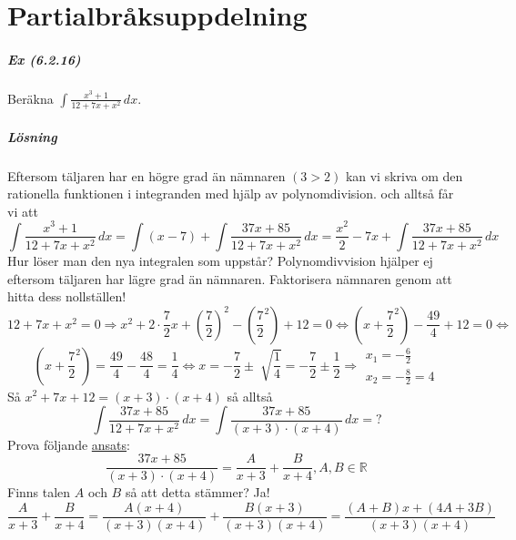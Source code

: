 \chapter{Partialbråksuppdelning}
\paragraph*{Ex (6.2.16)} Beräkna $\int\frac{x^3+1}{12+7x+x^2}\, dx$.
\paragraph{Lösning}
Eftersom täljaren har en högre grad än nämnaren $(3>2)$ kan vi skriva om den rationella funktionen i integranden med hjälp av polynomdivision.
och alltså får vi att
\begin{equation*}
    \int\frac{x^3+1}{12+7x+x^2}\, dx=
    \int (x-7) + \int\frac{37x+85}{12+7x+x^2}\, dx=
    \frac{x^2}{2}-7x+\int\frac{37x+85}{12+7x+x^2}\, dx
\end{equation*}
Hur löser man den nya integralen som uppstår?
Polynomdivvision hjälper ej eftersom täljaren har lägre grad än nämnaren.
Faktorisera nämnaren genom att hitta dess nollställen!
\begin{equation*}
    12+7x+x^2=0\Rightarrow
    x^2+2\cdot \frac{7}{2}x+(\frac{7}{2})^2-(\frac{7}{2}^2)+12=0\Leftrightarrow
    (x+\frac{7}{2}^2)-\frac{49}{4}+12=0\Leftrightarrow
\end{equation*}
\begin{equation*}
    (x+\frac{7}{2}^2)=\frac{49}{4}-\frac{48}{4}=\frac{1}{4}\Leftrightarrow
    x=-\frac{7}{2}\pm\sqrt[]{\frac{1}{4}}=-\frac{7}{2}\pm\frac{1}{2}\Rightarrow
    \begin{matrix}
        x_1=-\frac{6}{2} \\
        x_2=-\frac{8}{2}=4
    \end{matrix}
\end{equation*}
Så $x^2+7x+12=(x+3)\cdot(x+4)$ så alltså
\begin{equation*}
    \int\frac{37x+85}{12+7x+x^2}\, dx=
    \int\frac{37x+85}{(x+3)\cdot(x+4)}\, dx=?
\end{equation*}
Prova följande \underline{ansats}:
\begin{equation*}
    \frac{37x+85}{(x+3)\cdot(x+4)}=
    \frac{A}{x+3}+\frac{B}{x+4},A,B\in\mathbb{R}
\end{equation*}
Finns talen $A$ och $B$ så att detta stämmer? Ja!
\begin{equation*}
    \frac{A}{x+3}+\frac{B}{x+4}=
    \frac{A(x+4)}{(x+3)(x+4)}+\frac{B(x+3)}{(x+3)(x+4)}=
    \frac{(A+B)x+(4A+3B)}{(x+3)(x+4)}
\end{equation*}
